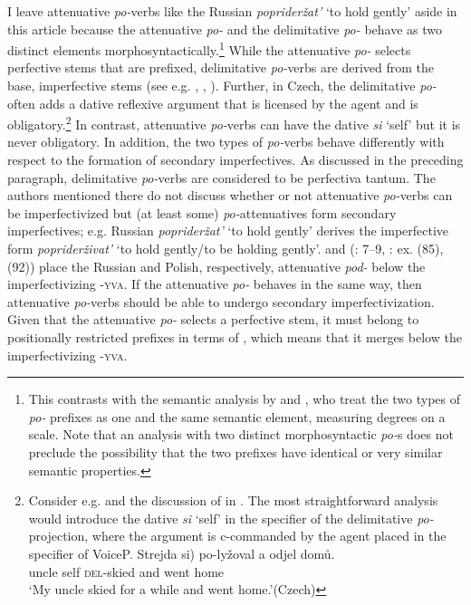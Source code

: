 \documentclass[output=paper,colorlinks,citecolor=brown]{langscibook}
\begin{document}
\noindent I leave attenuative \textit{po-}verbs like the Russian \textit{poprideržat'} ‘to hold gently’ aside in this article because the attenuative \textit{po-} and the delimitative \textit{po-} behave as two distinct elements morphosyntactically.\footnote{This contrasts with the semantic analysis by \citet{Souckova2004b, Souckova2004a} and \citet{Kagan2016}, who treat the two types of \textit{po-} prefixes as one and the same semantic element, measuring degrees on a scale. Note that an analysis with two distinct morphosyntactic \textit{po-}s does not preclude the possibility that the two prefixes have identical or very similar semantic properties.}  While the attenuative \textit{po-} selects perfective stems that are prefixed, delimitative \textit{po-}verbs are derived from the base, imperfective stems (see e.g. \citealt[391, 396]{Isačenko1962}, \citealt[101]{Zaliznjak.Smelev1997}, \citealt[398]{Petr1986}). Further, in Czech, the delimitative \textit{po-} often adds a dative reflexive argument that is licensed by the agent and is obligatory.\footnote{Consider e.g.  and the discussion of  in . The most straightforward analysis would introduce the dative \textit{si} ‘self’ in the specifier of the delimitative \textit{po-} projection, where the argument is c-commanded by the agent placed in the specifier of VoiceP. \ea\label{biskup:ex:footnote3}\gll Strejda \minsp{*(} si) po-lyžoval a odjel domů.\\
uncle {} self \textsc{del}-skied and went home\\
\glt ‘My uncle skied for a while and went home.’\hfill (Czech)\z
} In contrast, attenuative \textit{po-}verbs can have the dative \textit{si} ‘self’ but it is never obligatory. In addition, the two types of \textit{po-}verbs behave differently with respect to the formation of secondary imperfectives. As discussed in the preceding paragraph, delimitative \textit{po-}verbs are considered to be perfectiva tantum. The authors mentioned there do not discuss whether or not attenuative \textit{po-}verbs can be imperfectivized but (at least some) \textit{po-}attenuatives form secondary imperfectives; e.g. Russian \textit{poprideržat'} ‘to hold gently’ derives the imperfective form \textit{popriderživat'} ‘to hold gently/to be holding gently’. \citet[96]{Tatevosov2009} and \citeauthor{KlimekJankowska.Blaszczak2022} (\citeyear{KlimekJankowska.Blaszczak2022}: 7--9, \citeyear{KlimekJankowska.Blaszczak2023}: ex. (85), (92)) place the Russian and Polish, respectively, attenuative \textit{pod-} below the imperfectivizing \textsc{-yva}. If the attenuative \textit{po-} behaves in the same way, then attenuative \textit{po-}verbs should be able to undergo secondary imperfectivization. Given that the attenuative \textit{po-} selects a perfective stem, it must belong to positionally restricted prefixes in terms of \citet{Tatevosov2009}, which means that it merges below the imperfectivizing \textsc{-yva}.
\end{document}
